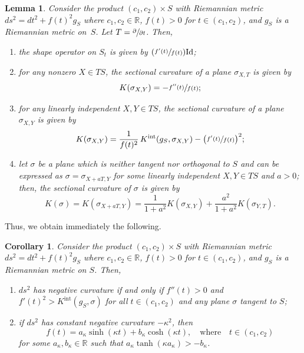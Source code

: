 \documentclass[10pt]{amsart}
\newcommand{\Psfrac}[2]{(\sfrac{#1}{#2})}
\newcommand{\Int}{\mathrm{int}}
\newtheorem{lemma}[theorem]{Lemma}
\newtheorem{corollary}[theorem]{Corollary}
\theoremstyle{definition}
\renewcommand{\>}{{\rangle}}
\newcommand{\<}{{\langle}}
\begin{document}
\begin{lemma}\label{lemma: curvature for product}
Consider the product $(c_1,c_2)\times S$ with Riemannian metric $ds^2 = dt^2+f(t)^2g_S$ where $c_1,c_2\in\mathbb R$, $f(t)>0$ for $t\in(c_1,c_2)$, and $g_S$ is a Riemannian metric on~$S$. Let $T = \sfrac{\partial}{\partial t}$. Then,
\begin{enumerate}
\item \label{eigenvalues for product} the shape operator on $S_t$ is given by $\Psfrac{f'(t)}{f(t)}\textup{Id}$;
\item\label{normal for product} for any nonzero $X\in TS$, the sectional curvature of a plane $\sigma_{X,T}$ is given by\vspace*{-3pt}
\begin{equation*}
K(\sigma_{X,Y}) = -\sfrac{f''(t)}{f(t)};
\end{equation*}
\item\label{level for product} for any linearly independent $X,Y\in TS$, the sectional curvature of a plane $\sigma_{X,Y}$ is given by\vspace*{-3pt}
\begin{equation*}
K(\sigma_{X,Y}) = \frac{1}{f(t)^2}\,K^{\Int}(g_S, \sigma_{X,Y})-\bigl(\sfrac{f'(t)}{f(t)}\bigr)^2;
\end{equation*}
\item\label{all for product} let $\sigma$ be a plane which is neither tangent nor orthogonal to $S$ and can be expressed as $\sigma=\sigma_{X+aT, Y}$ for some linearly independent $X,Y\in TS$ and $a>0$; then, the sectional curvature of $\sigma$ is given by\vspace*{-3pt}
\begin{equation*}
K(\sigma)=K(\sigma_{X+aT, Y}) = \frac{1}{1+a^2}K(\sigma_{X,Y})+\frac{a^2}{1+a^2}K(\sigma_{Y,T}).
\end{equation*}
\end{enumerate}
\end{lemma}

Thus, we obtain immediately the following.

\begin{corollary}
Consider the product $(c_1,c_2)\times S$ with Riemannian metric $ds^2 = dt^2+f(t)^2g_S$ where $c_1,c_2\in\mathbb R$, $f(t)>0$ for $t\in(c_1,c_2)$, and $g_S$ is a Riemannian metric on $S$. Then,
\begin{enumerate}
\item $ds^2$ has negative curvature if and only if $f''(t)>0$ and $f'(t)^2>K^{\Int}(g_S,\sigma)$ for all $t\in(c_1,c_2)$ and any plane $\sigma$ tangent to $S$;
\item if $ds^2$ has constant negative curvature $-\kappa^2$, then
\begin{equation*}
f(t)=a_\kappa\sinh(\kappa t)+b_\kappa\cosh(\kappa t), \quad \text{where}\quad t\in(c_1,c_2)
\end{equation*}
for some $a_\kappa,b_\kappa\in \mathbb R$ such that $a_\kappa\tanh(\kappa a_\kappa)>-b_\kappa$.
\end{enumerate}
\end{corollary}
\end{document}
